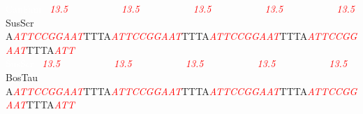 \documentclass[11pt,twoside,reqno,a4paper]{article}
\begin{document}
{\textcolor{white}{CanFam	}\ \textit{\textcolor{red}{13.5}}\ \ \ \ \ \ \ \ \ \ \ \textit{\textcolor{red}{13.5}}\ \ \ \ \ \ \ \ \ \ \ \textit{\textcolor{red}{13.5}}\ \ \ \ \ \ \ \ \ \ \ \textit{\textcolor{red}{13.5}}\ \ \ \ \ \ \ \ \ \ \ \textit{\textcolor{red}{13.5}}\\
SusScr	A\textit{\textcolor{red}{A}}\textit{\textcolor{red}{T}}\textit{\textcolor{red}{T}}\textit{\textcolor{red}{C}}\textit{\textcolor{red}{C}}\textit{\textcolor{red}{G}}\textit{\textcolor{red}{G}}\textit{\textcolor{red}{A}}\textit{\textcolor{red}{A}}\textit{\textcolor{red}{T}}TTTA\textit{\textcolor{red}{A}}\textit{\textcolor{red}{T}}\textit{\textcolor{red}{T}}\textit{\textcolor{red}{C}}\textit{\textcolor{red}{C}}\textit{\textcolor{red}{G}}\textit{\textcolor{red}{G}}\textit{\textcolor{red}{A}}\textit{\textcolor{red}{A}}\textit{\textcolor{red}{T}}TTTA\textit{\textcolor{red}{A}}\textit{\textcolor{red}{T}}\textit{\textcolor{red}{T}}\textit{\textcolor{red}{C}}\textit{\textcolor{red}{C}}\textit{\textcolor{red}{G}}\textit{\textcolor{red}{G}}\textit{\textcolor{red}{A}}\textit{\textcolor{red}{A}}\textit{\textcolor{red}{T}}TTTA\textit{\textcolor{red}{A}}\textit{\textcolor{red}{T}}\textit{\textcolor{red}{T}}\textit{\textcolor{red}{C}}\textit{\textcolor{red}{C}}\textit{\textcolor{red}{G}}\textit{\textcolor{red}{G}}\textit{\textcolor{red}{A}}\textit{\textcolor{red}{A}}\textit{\textcolor{red}{T}}TTTA\textit{\textcolor{red}{A}}\textit{\textcolor{red}{T}}\textit{\textcolor{red}{T}}\\
\textcolor{white}{SusScr	}\ \textit{\textcolor{red}{13.5}}\ \ \ \ \ \ \ \ \ \ \ \textit{\textcolor{red}{13.5}}\ \ \ \ \ \ \ \ \ \ \ \textit{\textcolor{red}{13.5}}\ \ \ \ \ \ \ \ \ \ \ \textit{\textcolor{red}{13.5}}\ \ \ \ \ \ \ \ \ \ \ \textit{\textcolor{red}{13.5}}\\
BosTau	A\textit{\textcolor{red}{A}}\textit{\textcolor{red}{T}}\textit{\textcolor{red}{T}}\textit{\textcolor{red}{C}}\textit{\textcolor{red}{C}}\textit{\textcolor{red}{G}}\textit{\textcolor{red}{G}}\textit{\textcolor{red}{A}}\textit{\textcolor{red}{A}}\textit{\textcolor{red}{T}}TTTA\textit{\textcolor{red}{A}}\textit{\textcolor{red}{T}}\textit{\textcolor{red}{T}}\textit{\textcolor{red}{C}}\textit{\textcolor{red}{C}}\textit{\textcolor{red}{G}}\textit{\textcolor{red}{G}}\textit{\textcolor{red}{A}}\textit{\textcolor{red}{A}}\textit{\textcolor{red}{T}}TTTA\textit{\textcolor{red}{A}}\textit{\textcolor{red}{T}}\textit{\textcolor{red}{T}}\textit{\textcolor{red}{C}}\textit{\textcolor{red}{C}}\textit{\textcolor{red}{G}}\textit{\textcolor{red}{G}}\textit{\textcolor{red}{A}}\textit{\textcolor{red}{A}}\textit{\textcolor{red}{T}}TTTA\textit{\textcolor{red}{A}}\textit{\textcolor{red}{T}}\textit{\textcolor{red}{T}}\textit{\textcolor{red}{C}}\textit{\textcolor{red}{C}}\textit{\textcolor{red}{G}}\textit{\textcolor{red}{G}}\textit{\textcolor{red}{A}}\textit{\textcolor{red}{A}}\textit{\textcolor{red}{T}}TTTA\textit{\textcolor{red}{A}}\textit{\textcolor{red}{T}}\textit{\textcolor{red}{T}}\\
}
\end{document}
